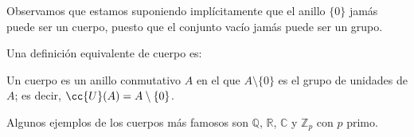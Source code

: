 Observamos que estamos suponiendo implícitamente que el anillo $\{0\}$ jamás puede ser un cuerpo, puesto que el conjunto vacío jamás puede ser un grupo.

\begin{observacion}
    Una definición equivalente de cuerpo es:
    \begin{center}
    Un cuerpo es un anillo conmutativo $A$ en el que $A\setminus \{0\}$ es el grupo de unidades de $A$; es decir, $\cc{U}(A) = A\setminus \{0\}$.
    \end{center}
\end{observacion}

\begin{ejemplo}
    Algunos ejemplos de los cuerpos más famosos son $\mathbb{Q}$, $\mathbb{R}$, $\mathbb{C}$ y $\mathbb{Z}_p$ con $p$ primo.
\end{ejemplo}



